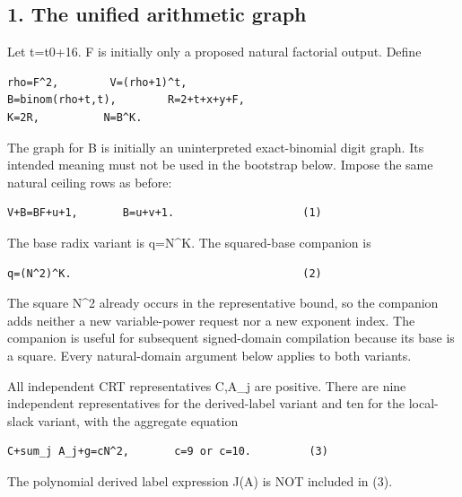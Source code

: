 \subsection*{1. The unified arithmetic graph}



Let t=\allowbreak{}t0+\allowbreak{}16. F is initially only a proposed natural factorial output. Define



\begin{verbatim}
rho=F^2,        V=(rho+1)^t,
B=binom(rho+t,t),        R=2+t+x+y+F,
K=2R,          N=B^K.
\end{verbatim}

The graph for B is initially an uninterpreted exact-binomial digit graph. Its intended meaning must not be used in the bootstrap below. Impose the same natural ceiling rows as before:



\begin{verbatim}
V+B=BF+u+1,       B=u+v+1.                    (1)
\end{verbatim}

The base radix variant is q=\allowbreak{}N\textasciicircum{}\allowbreak{}K. The squared-base companion is



\begin{verbatim}
q=(N^2)^K.                                    (2)
\end{verbatim}

The square N\textasciicircum{}\allowbreak{}2 already occurs in the representative bound, so the companion adds neither a new variable-power request nor a new exponent index. The companion is useful for subsequent signed-domain compilation because its base is a square. Every natural-domain argument below applies to both variants.



All independent CRT representatives C,A\_\allowbreak{}j are positive. There are nine independent representatives for the derived-label variant and ten for the local-slack variant, with the aggregate equation



\begin{verbatim}
C+sum_j A_j+g=cN^2,       c=9 or c=10.         (3)
\end{verbatim}

The polynomial derived label expression J(A) is NOT included in (3).



